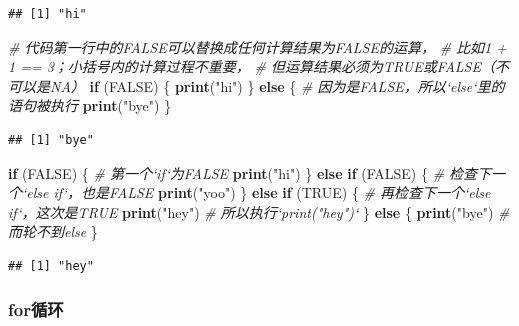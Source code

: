 \documentclass[]{book}
\newenvironment{Shaded}{\begin{snugshade}}{\end{snugshade}}
\newcommand{\CommentTok}[1]{\textcolor[rgb]{0.56,0.35,0.01}{\textit{#1}}}
\newcommand{\ControlFlowTok}[1]{\textcolor[rgb]{0.13,0.29,0.53}{\textbf{#1}}}
\newcommand{\KeywordTok}[1]{\textcolor[rgb]{0.13,0.29,0.53}{\textbf{#1}}}
\newcommand{\NormalTok}[1]{#1}
\newcommand{\OtherTok}[1]{\textcolor[rgb]{0.56,0.35,0.01}{#1}}
\newcommand{\StringTok}[1]{\textcolor[rgb]{0.31,0.60,0.02}{#1}}
\begin{document}
\begin{verbatim}
## [1] "hi"
\end{verbatim}

\begin{Shaded}
\begin{Highlighting}[]
\CommentTok{# 代码第一行中的FALSE可以替换成任何计算结果为FALSE的运算，}
\CommentTok{# 比如1 + 1 == 3；小括号内的计算过程不重要，}
\CommentTok{# 但运算结果必须为TRUE或FALSE（不可以是NA）}
\ControlFlowTok{if}\NormalTok{ (}\OtherTok{FALSE}\NormalTok{) \{ }
  \KeywordTok{print}\NormalTok{(}\StringTok{"hi"}\NormalTok{)}
\NormalTok{\} }\ControlFlowTok{else}\NormalTok{ \{ }\CommentTok{# 因为是FALSE，所以`else`里的语句被执行}
  \KeywordTok{print}\NormalTok{(}\StringTok{"bye"}\NormalTok{)}
\NormalTok{\}}
\end{Highlighting}
\end{Shaded}

\begin{verbatim}
## [1] "bye"
\end{verbatim}

\begin{Shaded}
\begin{Highlighting}[]
\ControlFlowTok{if}\NormalTok{ (}\OtherTok{FALSE}\NormalTok{) \{ }\CommentTok{# 第一个`if`为FALSE}
  \KeywordTok{print}\NormalTok{(}\StringTok{"hi"}\NormalTok{)}
\NormalTok{\} }\ControlFlowTok{else} \ControlFlowTok{if}\NormalTok{ (}\OtherTok{FALSE}\NormalTok{) \{ }\CommentTok{# 检查下一个`else if`，也是FALSE}
  \KeywordTok{print}\NormalTok{(}\StringTok{"yoo"}\NormalTok{)}
\NormalTok{\} }\ControlFlowTok{else} \ControlFlowTok{if}\NormalTok{ (}\OtherTok{TRUE}\NormalTok{) \{ }\CommentTok{# 再检查下一个`else if`，这次是TRUE}
  \KeywordTok{print}\NormalTok{(}\StringTok{"hey"}\NormalTok{) }\CommentTok{# 所以执行`print("hey")`}
\NormalTok{\} }\ControlFlowTok{else}\NormalTok{ \{}
  \KeywordTok{print}\NormalTok{(}\StringTok{"bye"}\NormalTok{) }\CommentTok{# 而轮不到else}
\NormalTok{\}}
\end{Highlighting}
\end{Shaded}

\begin{verbatim}
## [1] "hey"
\end{verbatim}

\hypertarget{control-flow-for-loop}{%
\subsubsection{for循环}\label{control-flow-for-loop}}
\end{document}
